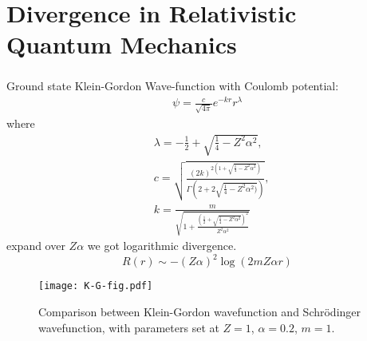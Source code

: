 \documentclass[8pt]{beamer}
\renewcommand{\a}{\alpha}
\begin{document}
\section{Divergence in Relativistic Quantum Mechanics}
\begin{frame}
	\frametitle{\insertsectionhead}
	\begin{minipage}{0.43\linewidth}
		Ground state Klein-Gordon Wave-function with Coulomb potential:
		\begin{align}
			\psi  =\frac{c}{\sqrt{4\pi}}e^{-kr}r^\lambda
		\end{align}
		where
		\begin{align*}
			  & \lambda=-\frac{1}{2}+\sqrt{\frac{1}{4}-Z^2\alpha^2},\; \\&  c=\sqrt{\frac{(2k)^{2(1+\sqrt{\frac{1}{4}-Z^2\alpha^2})}}{\Gamma(2+2\sqrt{\frac{1}{4}-Z^2\alpha^2)})}},\\&    k=\frac{m}{\sqrt{1+\frac{(\frac{1}{2}+\sqrt{\frac{1}{4}-Z^2\alpha^2})^2}{Z^2\alpha^2}}}
		\end{align*}
		expand over $Z\a$ we got logarithmic divergence.
		$$R(r)          \sim-(Z\alpha)^2\log(2m Z \a r)   $$
	\end{minipage}
	\begin{minipage}{0.5\linewidth}
		\begin{figure}
			\centering
			\texttt{[image: K-G-fig.pdf]}
			\caption{Comparison between Klein-Gordon wavefunction and Schr\"odinger wavefunction, with parameters set at $Z=1$, $\a=0.2$, $m=1$. }
		\end{figure}
	\end{minipage}
\end{frame}
\end{document}
